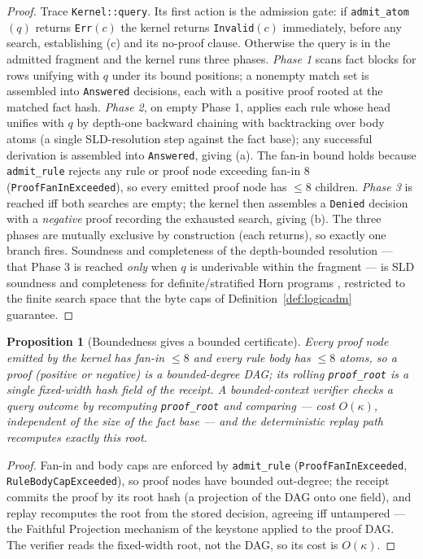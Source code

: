 \documentclass[11pt,oneside]{book}
\theoremstyle{definition}
\theoremstyle{plain}
\newtheorem{proposition}[theorem]{Proposition}
\theoremstyle{remark}
\newcommand{\CL}{\kappa}                       %
\newcommand{\code}[1]{\texttt{#1}}
\begin{document}
\begin{proof}
Trace \code{Kernel::query}. Its first action is the admission gate: if
\code{admit\_atom}$(q)$ returns \code{Err}$(c)$ the kernel returns \code{Invalid}$(c)$
immediately, before any search, establishing (c) and its no-proof clause. Otherwise the query
is in the admitted fragment and the kernel runs three phases. \emph{Phase 1} scans fact blocks
for rows unifying with $q$ under its bound positions; a nonempty match set is assembled into
\code{Answered} decisions, each with a positive proof rooted at the matched fact hash.
\emph{Phase 2}, on empty Phase 1, applies each rule whose head unifies with $q$ by depth-one
backward chaining with backtracking over body atoms (a single SLD-resolution step against the
fact base); any successful derivation is assembled into \code{Answered}, giving (a). The
fan-in bound holds because \code{admit\_rule} rejects any rule or proof node exceeding fan-in
$8$ (\code{ProofFanInExceeded}), so every emitted proof node has $\le 8$ children.
\emph{Phase 3} is reached iff both searches are empty; the kernel then assembles a
\code{Denied} decision with a \emph{negative} proof recording the exhausted search, giving (b).
The three phases are mutually exclusive by construction (each returns), so exactly one branch
fires. Soundness and completeness of the depth-bounded resolution --- that Phase 3 is reached
\emph{only} when $q$ is underivable within the fragment --- is SLD soundness and completeness
for definite/stratified Horn programs \cite{kowalski1974,lloyd1987}, restricted to the finite
search space that the byte caps of Definition~\ref{def:logicadm} guarantee. \end{proof}

\begin{proposition}[Boundedness gives a bounded certificate]\label{prop:boundedcert}
Every proof node emitted by the kernel has fan-in $\le 8$ and every rule body has $\le 8$
atoms, so a proof (positive or negative) is a bounded-degree DAG; its rolling
\code{proof\_root} is a single fixed-width hash field of the receipt. A bounded-context
verifier checks a query outcome by recomputing \code{proof\_root} and comparing --- cost
$O(\CL)$, independent of the size of the fact base --- and the deterministic replay path
recomputes exactly this root.
\end{proposition}

\begin{proof}
Fan-in and body caps are enforced by \code{admit\_rule} (\code{ProofFanInExceeded},
\code{RuleBodyCapExceeded}), so proof nodes have bounded out-degree; the receipt commits the
proof by its root hash (a projection of the DAG onto one field), and replay recomputes the
root from the stored decision, agreeing iff untampered --- the Faithful Projection mechanism of
the keystone applied to the proof DAG. The verifier reads the fixed-width root, not the DAG, so
its cost is $O(\CL)$. \end{proof}
\end{document}
